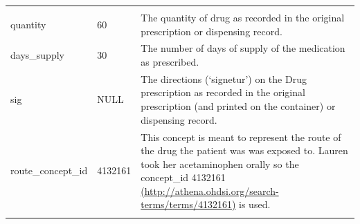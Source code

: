 \documentclass[]{book}
\begin{document}
\begin{longtable}[]{@{}lll@{}}
\begin{minipage}[t]{0.48\columnwidth}
\end{minipage}\tabularnewline
\begin{minipage}[t]{0.30\columnwidth}\raggedright
quantity\strut
\end{minipage} & \begin{minipage}[t]{0.14\columnwidth}\raggedright
60\strut
\end{minipage} & \begin{minipage}[t]{0.48\columnwidth}\raggedright
The quantity of drug as recorded in the original prescription or dispensing record.\strut
\end{minipage}\tabularnewline
\begin{minipage}[t]{0.30\columnwidth}\raggedright
days\_supply\strut
\end{minipage} & \begin{minipage}[t]{0.14\columnwidth}\raggedright
30\strut
\end{minipage} & \begin{minipage}[t]{0.48\columnwidth}\raggedright
The number of days of supply of the medication as prescribed.\strut
\end{minipage}\tabularnewline
\begin{minipage}[t]{0.30\columnwidth}\raggedright
sig\strut
\end{minipage} & \begin{minipage}[t]{0.14\columnwidth}\raggedright
NULL\strut
\end{minipage} & \begin{minipage}[t]{0.48\columnwidth}\raggedright
The directions (`signetur') on the Drug prescription as recorded in the original prescription (and printed on the container) or dispensing record.\strut
\end{minipage}\tabularnewline
\begin{minipage}[t]{0.30\columnwidth}\raggedright
route\_concept\_id\strut
\end{minipage} & \begin{minipage}[t]{0.14\columnwidth}\raggedright
4132161\strut
\end{minipage} & \begin{minipage}[t]{0.48\columnwidth}\raggedright
This concept is meant to represent the route of the drug the patient was was exposed to. Lauren took her acetaminophen orally so the concept\_id 4132161 \href{http://athena.ohdsi.org/search-terms/terms/4132161}{(http://athena.ohdsi.org/search-terms/terms/4132161)} is used.\strut
\end{minipage}\tabularnewline
\begin{minipage}[t]{0.30\columnwidth}\raggedright

\end{minipage}
\end{longtable}
\end{document}
